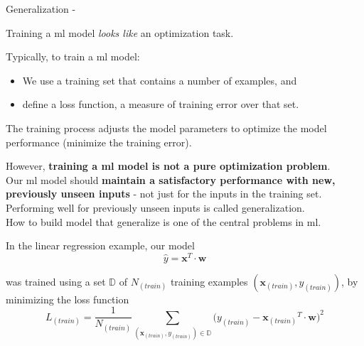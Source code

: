 
\begin{frame}[t,allowframebreaks]{Generalization -}

    Training a \gls{ml} model {\em looks like} an optimization task.\\
    \vspace{0.1cm}
    \begin{blockexample}{}
      Typically, to train a \gls{ml} model: 
      \begin{itemize}
        \item 
        We use a \gls{training set} 
        that contains a number of examples, and
        \item
        define a \gls{loss function},
        a measure of training error over that set.
      \end{itemize}
      The training process adjusts the model parameters
      to optimize the model performance (minimize the training error).\\
    \end{blockexample}
    \vspace{0.2cm}
    However, {\bf training a \gls{ml} model is not a pure optimization problem}.\\
    \vspace{0.2cm}
    Our \gls{ml} model should {\bf maintain a satisfactory performance 
    with new, previously unseen inputs} - 
    not just for the inputs in the training set.\\
    \vspace{0.2cm}
    Performing well for previously unseen inputs is called 
    \gls{generalization}.\\
    \vspace{0.2cm}
    How to build model that generalize is one of the central problems in \gls{ml}.


    \framebreak


    In the linear regression example, our model
    \begin{equation}
        \hat{y} = {\mathbf x}^T \cdot {\mathbf w}
    \end{equation}        

    was trained using a set $\mathbb{D}$ of $N_{(train)}$
    training examples $({\mathbf x_{(train)}},y_{(train)})$, 
    by minimizing the loss function
    \begin{equation}
        L_{(train)} = \frac{1}{N_{(train)}} 
        \sum_{({\mathbf x_{(train)}},y_{(train)})  \in \mathbb{D}}
        \Big( y_{(train)} - {\mathbf x_{(train)}}^T \cdot {\mathbf w} \Big)^2
    \end{equation}        


\end{frame}
